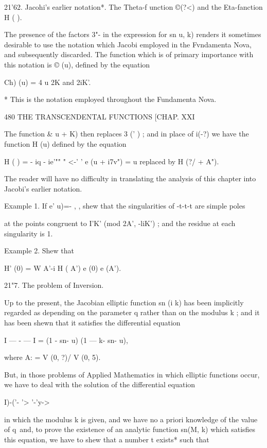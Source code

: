 21'62. Jacohi's earlier notation*. The Theta-f unction ©(?<) and the
Eta-fanction H ( ).

The presence of the factors 3"- in the expression for sn u, k) renders
it sometimes desirable to use the notation which Jacobi employed in
the Fvndamenta Nova, and subsequently discarded. The function which is
of primary importance with this notation is © (u), defined by the
equation

Ch) (u) = 4 u%
2K and 2iK'.

* This is the notation employed throughout the Fundamenta Nova.

480 THE TRANSCENDENTAL FUNCTIONS [CHAP. XXI

The function \& u + K) then replaces 3 (' ) ; and in place of i(-?) we
have the function H (u) defined by the equation

H ( ) = - iq - ie'"" " <-' ' e (u + i7v") = u%
replaced by H (?/ + A").

The reader will have no difficulty in translating the analysis of this
chapter into Jacobi's earlier notation.

Example 1. If e' u)=- , , shew that the singularities of -t-t-t are
simple poles

at the points congruent to I'K' (mod 2A', -liK') ; and the residue at
each singularity is 1.

Example 2. Shew that

H' (0) = W A'-i H ( A') e (0) e (A').

21"7. The problem of Inversion.

Up to the present, the Jacobian elliptic function sn (i k) has been
implicitly regarded as depending on the parameter q rather than on the
modulus k ; and it has been shewn that it satisfies the differential
equation

I — - — I = (1 - sn- u) (1 — k- sn- u),

where A: = V (0, ?)/ V (0, 5).

But, in those problems of Applied Mathematics in which elliptic
functions occur, we have to deal with the solution of the differential
equation

 I)-('- '> '-'y->

in which the modulus k is given, and we have no a priori knowledge of
the value of q\ and, to prove the existence of an analytic function
sn(M, k) which satisfies this equation, we have to shew that a number
t exists* such that

